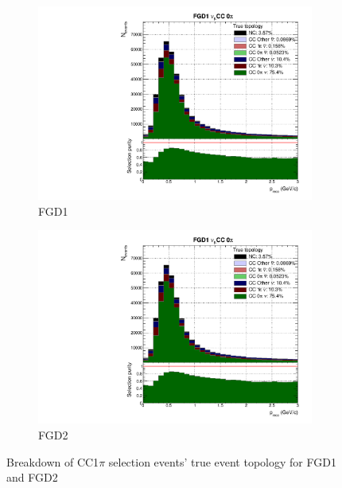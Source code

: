 \begin{figure}[h]
	\begin{subfigure}[t]{0.49\textwidth}
		\includegraphics[width=\textwidth,page=15, trim={0mm 0mm 0mm 9mm}, clip]{figures/mach3/2018/Selection/2018_RedNDmatrix_rebin_verbose_may_noweights_diagnostics}
		\caption{FGD1}
	\end{subfigure}
	\begin{subfigure}[t]{0.49\textwidth}
		\includegraphics[width=\textwidth,page=21, trim={0mm 0mm 0mm 9mm}, clip]{figures/mach3/2018/Selection/2018_RedNDmatrix_rebin_verbose_may_noweights_diagnostics}
		\caption{FGD2}
	\end{subfigure}
	\caption{Breakdown of \numubar CC1$\pi$ selection events' true event topology for FGD1 and FGD2 }
	\label{fig:numubar_cc1pi_topology_2018}
\end{figure}

